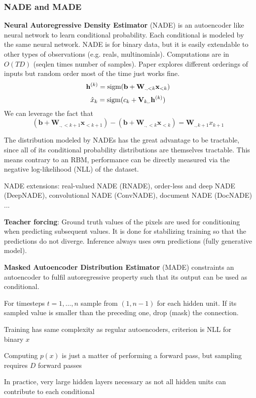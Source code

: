 \documentclass[12pt]{article}
\begin{document}
\subsubsection{NADE and MADE}
\par \textbf{Neural Autoregressive Density Estimator} (NADE) is an autoencoder like neural network to learn conditional probability. Each conditional is modeled by the same neural network. NADE is for binary data, but it is easily extendable to other types of observations (e.g. reals, multinomials). Computations are in $O(TD)$ (seqlen times number of samples). Paper explores different orderings of inputs but random order most of the time just works fine.
\[ \mathbf{h}^{(k)} = \mathop{\text{sigm}}(\mathbf{b} + \mathbf{W}_{.,<k} \mathbf{x}_{<k} ) \]
\[ \hat{x}_k = \mathop{\text{sigm}}(c_k + \mathbf{V}_{k,.} \mathbf{h}^{(k)}) \]
We can leverage the fact that
\[ (\mathbf{b} + \mathbf{W}_{.,<k+1} \mathbf{x}_{<k+1}) - (\mathbf{b} + \mathbf{W}_{.,<k} \mathbf{x}_{<k} ) = \mathbf{W}_{.,k+1} x_{k+1} \]
\par The distribution modeled by NADEs has the great advantage to be tractable, since all of its conditional probability distributions are themselves tractable. This means contrary to an RBM, performance can be directly measured via the negative log-likelihood (NLL) of the dataset.
\par NADE extensions: real-valued NADE (RNADE), order-less and deep NADE (DeepNADE), convolutional NADE (ConvNADE), document NADE (DocNADE) ...
\par \textbf{Teacher forcing}: Ground truth values of the pixels are used for conditioning when predicting subsequent values. It is done for stabilizing training so that the predictions do not diverge. Inference always uses own predictions (fully generative model).
\par \textbf{Masked Autoencoder Distribution Estimator} (MADE) constraints an autoencoder to fulfil autoregressive property such that its output can be used as conditional. \par For timesteps $t=1,\dots , n$ sample from $(1,n-1)$ for each hidden unit. If its sampled value is smaller than the preceding one, drop (mask) the connection.
\ulb
\item Training has same complexity as regular autoencoders, criterion is NLL for binary $x$
\item Computing $p(x)$ is just a matter of performing a forward pass, but sampling requires $D$ forward passes
\item In practice, very large hidden layers necessary as not all hidden units can contribute to each conditional
\ule
\end{document}
